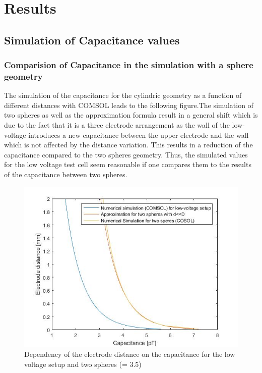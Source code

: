 \chapter{Results}
\section{Simulation of Capacitance values}
\subsection{Comparision of Capacitance in the simulation with a sphere geometry}
The simulation of the capacitance for the cylindric geometry as a function of different distances with COMSOL leads to the following figure.The simulation of two spheres as well as the approximation formula result in a general shift which is due to the fact that it is a three electrode arrangement as the wall of the low-voltage introduces a new capacitance between the upper electrode and the wall which is not affected by the distance variation. This results in a reduction of the capacitance compared to the two spheres geometry. Thus, the simulated values for the low voltage test cell seem reasonable if one compares them to the results of the capacitance between two spheres. \newline 


\begin{figure}[htbp]
	\centering
	\includegraphics[scale=0.3]{figures/Comparison_Low_voltage_Two_spheres}		
	\caption[Kurze Abbildungsbeschreibung]{Dependency of the electrode distance on the capacitance for the low voltage setup and two spheres (\epsilon = 3.5) } %
	\label{fig.waveforms}
\end{figure}

